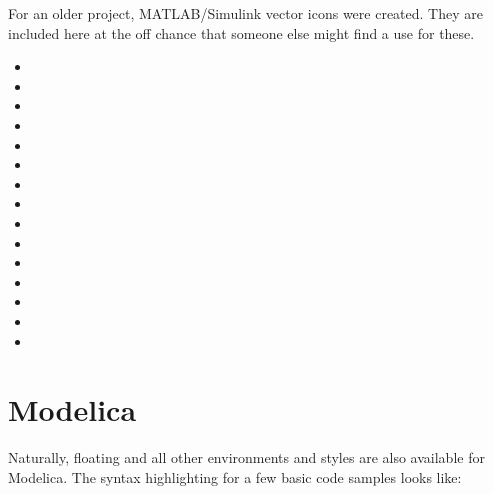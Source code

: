 For an older project, MATLAB/Simulink vector icons were created.
They are included here at the off chance that someone else might find a use for these.
\begin{itemize}
    \item {}
    \item {}
    \item {}
    \item {}
    \item {}
    \item {}
    \item {}
    \item {}
    \item {}
    \item {}
    \item {}
    \item {}
    \item {}
    \item {}
    \item {}
\end{itemize}

\section{Modelica}

Naturally, floating and all other environments and styles are also available for
Modelica.
The syntax highlighting for a few basic code samples \autocite{wikipedia_modelica_2020} looks like:

